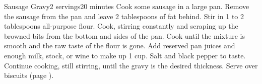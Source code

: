 \documentclass[../Cookbook.tex]{subfiles}
\begin{document}
\begin{recipe}[SausageGravy]{Sausage Gravy}{2 servings}{20 minutes}
	Cook some sausage in a large pan.
	Remove the sausage from the pan and leave 2 tablespoons of fat behind.
	Stir in 1 to 2 tablespoons all-purpose flour.
	Cook, stirring constantly and scraping up the browned bits from the bottom and sides of the pan.
	Cook until the mixture is smooth and the raw taste of the flour is gone.
	Add reserved pan juices and enough milk, stock, or wine to make up 1 cup.
	Salt and black pepper to taste.
	Continue cooking, still stirring, until the gravy is the desired thickness.
	Serve over biscuits (page \pageref{Biscuits}).
\end{recipe}
\end{document}
